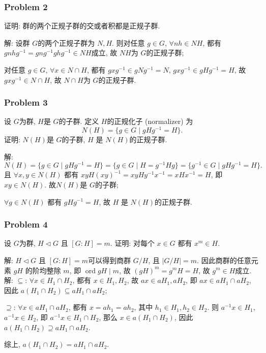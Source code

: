 \documentclass[a4paper,12pt]{ctexart}
\begin{document}
\subsubsection*{Problem 2} 
    证明: 群的两个正规子群的交或者积都是正规子群.
  
    解: 设群 $ G $的两个正规子群为 $ N,H $. 则对任意 $ g\in G $, $ \forall nh\in NH $, 
    都有 $ gnhg^{-1}=gng^{-1}ghg^{-1}\in NH $成立, 故 $ NH $为 $ G $的正规子群;

    对任意 $ g\in G $, $ \forall x\in N\cap H $, 都有 $ gxg^{-1}\in gNg^{-1}=N $, $ gxg^{-1}\in gHg^{-1}=H $, 故
    $ gxg^{-1}\in N\cap H $, 故 $ N\cap H $为 $ G $的正规子群.
  
\subsubsection*{Problem 3}
  设 $ G $为群, $ H $是 $ G $的子群. 定义 $ H $的正规化子 (normalizer) 为
  \[N(H)=\{g\in G\mid gHg^{-1}=H\}.\]
  证明: $ N(H) $是 $ G $的子群, $ H $ 是 $ N(H) $的正规子群.

  解: $ N(H)=\{g\in G\mid gHg^{-1}=H\}=\{g\in G\mid H=g^{-1}Hg\}=\{g^{-1}\in G\mid gHg^{-1}=H\}. $且 
  $ \forall x,y\in N(H) $ 都有 $ xyH(xy)^{-1}=xyHy^{-1}x^{-1}=xHx^{-1}=H $, 即 $ xy\in N(H) $. 故$ N(H) $是 $ G $的子群;

  $ \forall g\in N(H) $ 都有 $ gHg^{-1}=H $, 故 $ H $ 是 $ N(H) $的正规子群.
\subsubsection*{Problem 4}
  设 $ G $为群, $ H\triangleleft G $ 且 $ [G:H]=m $. 证明: 对每个 $ x\in G $ 都有 $ x^m\in H $.

    解: $ H\triangleleft G $ 且 $ [G:H]=m $可以得到商群 $ G/H $, 且 $ |G/H|=m $. 因此商群的任意元素 $ gH $ 的阶均整除 $ m $, 即 $ \operatorname{ord} gH\mid m $, 故 $ (gH)^m=g^mH=H $, 故 $ g^m\in H $成立. 
  解: $ \subseteq $: $ \forall x\in H_1\cap H_2 $, 都有 $ x\in H_1,H_2 $, 故 $ ax\in aH_1,aH_2 $, 即 $ ax\in aH_1\cap aH_2 $, 
  因此 $ a\left(H_1\cap H_2\right)\subseteq aH_1\cap aH_2 $;

  $ \supseteq $: $ \forall x\in aH_1\cap aH_2 $, 都有 $ x=ah_1=ah_2 $, 其中 $ h_1\in H_1,h_2\in H_2 $. 则 $ a^{-1}x\in H_1 $, 
  $ a^{-1}x\in H_2 $, 即 $ a^{-1}x\in H_1\cap H_2 $, 那么 $ x\in a\left( H_1\cap H_2\right) $, 因此 $ a\left(H_1\cap H_2\right) \supseteq aH_1\cap aH_2 $.

  综上, $ a\left(H_1\cap H_2\right)=aH_1\cap aH_2 $.
\end{document}
